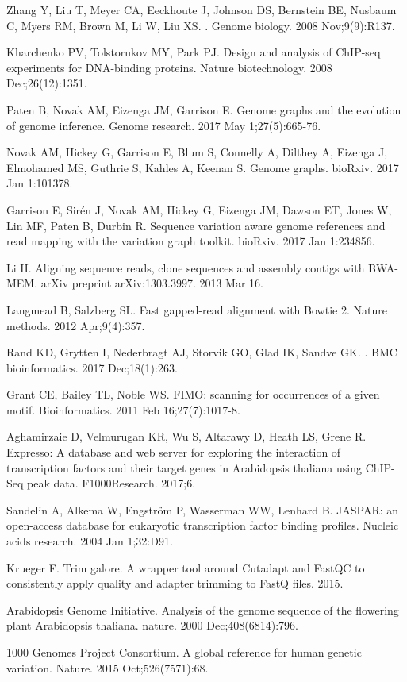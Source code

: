\documentclass[10pt,letterpaper]{article}
\begin{document}
\begin{thebibliography}{10}


Zhang Y, Liu T, Meyer CA, Eeckhoute J, Johnson DS, Bernstein BE, Nusbaum C, Myers RM, Brown M, Li W, Liu XS. 
. 
\newblock Genome biology. 2008 Nov;9(9):R137.

Kharchenko PV, Tolstorukov MY, Park PJ. Design and analysis of ChIP-seq experiments for DNA-binding proteins. Nature biotechnology. 2008 Dec;26(12):1351.

Paten B, Novak AM, Eizenga JM, Garrison E. Genome graphs and the evolution of genome inference. Genome research. 2017 May 1;27(5):665-76.

Novak AM, Hickey G, Garrison E, Blum S, Connelly A, Dilthey A, Eizenga J, Elmohamed MS, Guthrie S, Kahles A, Keenan S. Genome graphs. bioRxiv. 2017 Jan 1:101378.


Garrison E, Sirén J, Novak AM, Hickey G, Eizenga JM, Dawson ET, Jones W, Lin MF, Paten B, Durbin R. Sequence variation aware genome references and read mapping with the variation graph toolkit. bioRxiv. 2017 Jan 1:234856.


Li H. Aligning sequence reads, clone sequences and assembly contigs with BWA-MEM. arXiv preprint arXiv:1303.3997. 2013 Mar 16.

Langmead B, Salzberg SL. Fast gapped-read alignment with Bowtie 2. Nature methods. 2012 Apr;9(4):357.

Rand KD, Grytten I, Nederbragt AJ, Storvik GO, Glad IK, Sandve GK. 
. 
\newblock BMC bioinformatics. 2017 Dec;18(1):263.

Grant CE, Bailey TL, Noble WS. FIMO: scanning for occurrences of a given motif. Bioinformatics. 2011 Feb 16;27(7):1017-8.

Aghamirzaie D, Velmurugan KR, Wu S, Altarawy D, Heath LS, Grene R. Expresso: A database and web server for exploring the interaction of transcription factors and their target genes in Arabidopsis thaliana using ChIP-Seq peak data. F1000Research. 2017;6.

Sandelin A, Alkema W, {Engström} P, Wasserman WW, Lenhard B. 
JASPAR: an open\--access database for eukaryotic transcription factor binding profiles. Nucleic acids research. 2004 Jan 1;32:D91.

Krueger F. Trim galore. A wrapper tool around Cutadapt and FastQC to consistently apply quality and adapter trimming to FastQ files. 2015.

Arabidopsis Genome Initiative. Analysis of the genome sequence of the flowering plant Arabidopsis thaliana. nature. 2000 Dec;408(6814):796.

1000 Genomes Project Consortium. A global reference for human genetic variation. Nature. 2015 Oct;526(7571):68.

\end{thebibliography}
\end{document}
